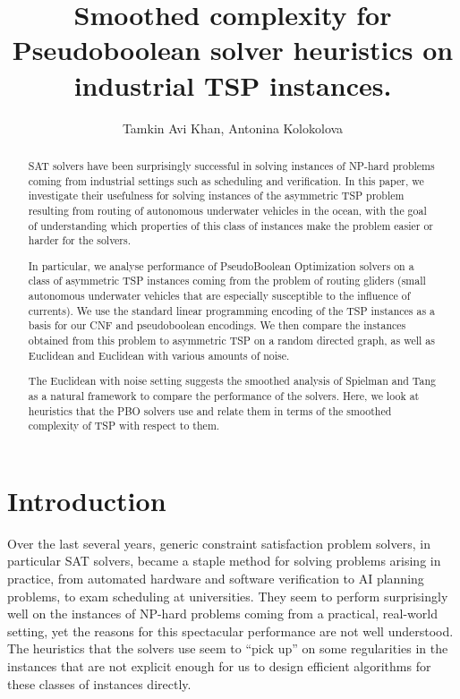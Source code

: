 \documentclass{llncs}
\begin{document}
\title{Smoothed complexity for Pseudoboolean solver heuristics on industrial TSP instances.}
\author{Tamkin Avi Khan, 
Antonina Kolokolova}

\maketitle

\begin{abstract}
SAT solvers have been surprisingly successful in solving instances of NP-hard problems coming from industrial settings such as scheduling and verification. In this paper, we investigate their usefulness for solving instances of the asymmetric TSP problem resulting from routing of autonomous underwater vehicles in the ocean, with the goal of understanding which properties of this class of  instances make the problem easier or harder for the solvers. 

In particular, we analyse performance of  PseudoBoolean Optimization solvers on a class of asymmetric TSP instances coming from the problem of routing gliders (small autonomous underwater vehicles that are especially susceptible to the influence of currents). We use the standard linear programming encoding of the TSP instances \cite{MTZ60} as a basis for our CNF and pseudoboolean encodings. We then compare the instances obtained from this problem to asymmetric TSP on a random directed graph, as well as Euclidean and Euclidean with various amounts of noise. 

 The Euclidean with noise setting suggests the smoothed analysis of Spielman and Tang \cite{ST04} as a natural framework to compare the performance of the solvers. Here, we look at heuristics that the PBO solvers use and relate them in terms of the smoothed complexity of TSP with respect to them.  
\end{abstract}

\section{Introduction}

Over the last several years, generic constraint satisfaction problem solvers, in particular SAT
solvers, became a staple method for solving problems arising in practice, from automated hardware and software verification to AI planning problems, to exam scheduling at
universities.  They seem to perform surprisingly well on the instances of NP-hard problems coming from a practical, real-world setting, yet the reasons for this spectacular performance are not well understood. The heuristics that the solvers use  seem to ``pick up'' on some regularities in the instances that are not explicit enough for us to design efficient algorithms for these classes of instances directly.   
\end{document}
